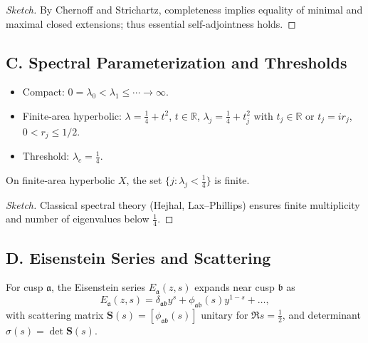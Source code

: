 \begin{proof}[Sketch]
By Chernoff and Strichartz, completeness implies equality of minimal and maximal closed extensions; thus essential self-adjointness holds.
\end{proof}


\subsection*{C. Spectral Parameterization and Thresholds}
\label{subsec:spec-param-part1}

\begin{conditions}
\label{cond:spec-param-part1}
\begin{itemize}
  \item Compact: $0=\lambda_0<\lambda_1\leq \cdots \to\infty$.
  \item Finite-area hyperbolic: $\lambda=\tfrac14+t^2$, $t\in\mathbb R$, $\lambda_j=\tfrac14+t_j^2$ with $t_j\in\mathbb R$ or $t_j=ir_j$, $0<r_j\leq 1/2$.
  \item Threshold: $\lambda_c=\tfrac14$.
\end{itemize}
\end{conditions}

\begin{proposition}
\label{prop:finite-small-part1}
On finite-area hyperbolic $X$, the set $\{j: \lambda_j < \tfrac14\}$ is finite.
\end{proposition}

\begin{proof}[Sketch]
Classical spectral theory (Hejhal, Lax–Phillips) ensures finite multiplicity and number of eigenvalues below $\tfrac14$.
\end{proof}


\subsection*{D. Eisenstein Series and Scattering}
\label{subsec:eisenstein-part1}

\begin{definition}
\label{def:eisenstein-norm-part1}
For cusp $\mathfrak a$, the Eisenstein series $E_{\mathfrak a}(z,s)$ expands near cusp $\mathfrak b$ as
\[
  E_{\mathfrak a}(z,s)=\delta_{\mathfrak a\mathfrak b}y^s + \phi_{\mathfrak a\mathfrak b}(s)y^{1-s} + \dots,
\]
with scattering matrix $\mathbf S(s)=[\phi_{\mathfrak a\mathfrak b}(s)]$ unitary for $\Re s=\tfrac12$, and determinant $\sigma(s)=\det \mathbf S(s)$.
\end{definition}

